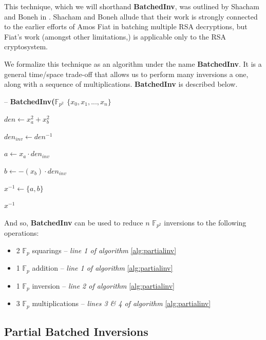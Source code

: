 This technique, which we will shorthand \textbf{BatchedInv}, was outlined by Shacham and Boneh in \cite{batching}. Shacham and Boneh allude that their work is strongly connected to the earlier efforts of Amos Fiat in batching multiple RSA decryptions, but Fiat's work (amongst other limitations,) is applicable only to the RSA cryptosystem. 

We formalize this technique as an algorithm under the name \textbf{BatchedInv}. It is a general time/space trade-off that allows us to perform many inversions a one, along with a sequence of multiplications. \textbf{BatchedInv} is described below.

\begin{algorithm}
\caption{-- \textbf{BatchedInv($\mathbb{F}_{p^{2}}$ $\{x_0, x_1, ..., x_n\}$}}\label{alg:batchedinv}
\begin{algorithmic}[1]
\State $den \gets x_{a}^{2} + x_{b}^{2}$

\State $den_{inv} \gets den^{-1}$

\State $a \gets x_{a} \cdot den_{inv}$

\State $b \gets -(x_{b}) \cdot den_{inv}$

\State $x^{-1} \gets \{a, b\}$

\State \Return $x^{-1}$
\end{algorithmic}
\end{algorithm}

And so, \textbf{BatchedInv} can be used to reduce $n$ $\mathbb{F}_{p^{2}}$ inversions to the following operations:

\begin{center}
\begin{itemize}
\item 2 $\mathbb{F}_{p}$ squarings -- \emph{line 1 of algorithm} \ref{alg:partialinv}
\item 1 $\mathbb{F}_{p}$ addition -- \emph{line 1 of algorithm} \ref{alg:partialinv}
\item 1 $\mathbb{F}_{p}$ inversion -- \emph{line 2 of algorithm} \ref{alg:partialinv}
\item 3 $\mathbb{F}_{p}$ multiplications -- \emph{lines 3 \& 4 of algorithm} \ref{alg:partialinv}
\end{itemize}
\end{center}

\subsection{Partial Batched Inversions}

